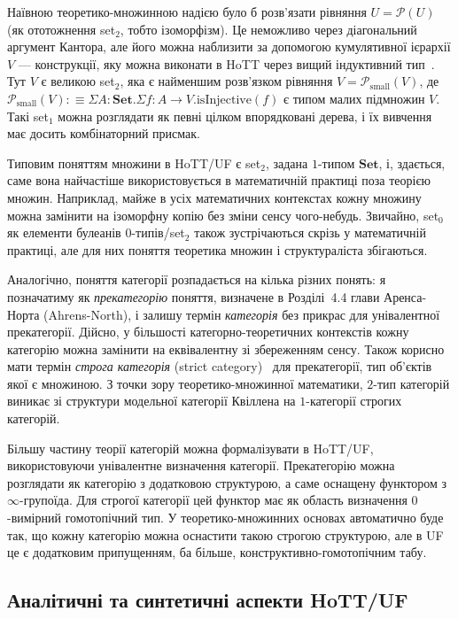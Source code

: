 \documentclass[12pt]{article}
\newcommand*{\Set}{\ensuremath{\mathbf{Set}}}
\begin{document}
Наївною теоретико-множинною надією було б розв'язати рівняння $U = \mathcal P(U)$ (як ототожнення set$_2$, тобто ізоморфізм). Це неможливо через діагональний аргумент Кантора, але його можна наблизити за допомогою кумулятивної ієрархії $V$ — конструкції, яку можна виконати в HoTT через вищий індуктивний тип~\cite[Розділ~10.5]{HoTTBook}. Тут $V$ є великою set$_2$, яка є найменшим розв'язком рівняння $V = \mathcal P_{\mathrm{small}}(V)$, де $\mathcal P_{\mathrm{small}}(V)
:\equiv \Sigma A : \Set. \Sigma f : A \to V. \mathrm{isInjective}(f)$
є типом малих підмножин $V$. Такі set$_1$ можна розглядати як певні цілком впорядковані дерева, і їх вивчення має досить комбінаторний присмак.

Типовим поняттям множини в HoTT/UF є set$_2$, задана $1$-типом $\Set$, і, здається, саме вона найчастіше використовується в математичній практиці поза теорією множин. Наприклад, майже в усіх математичних контекстах кожну множину можна замінити на ізоморфну копію без зміни сенсу чого-небудь. Звичайно, set$_0$ як елементи булеанів $0$-типів/set$_2$ також зустрічаються скрізь у математичній практиці, але для них поняття теоретика множин і структураліста збігаються.

Аналогічно, поняття категорії розпадається на кілька різних понять: я позначатиму як \emph{прекатегорію} поняття, визначене в Розділі~4.4 глави Аренса-Норта (Ahrens-North), і залишу термін \emph{категорія} без прикрас для унівалентної прекатегорії. Дійсно, у більшості категорно-теоретичних контекстів кожну категорію можна замінити на еквівалентну зі збереженням сенсу. Також корисно мати термін \emph{строга категорія} (strict category)~\cite[Розділ~9.6]{HoTTBook} для прекатегорії, тип об'єктів якої є множиною. З точки зору теоретико-множинної математики, $2$-тип категорій виникає зі структури модельної категорії Квіллена на $1$-категорії строгих категорій.

Більшу частину теорії категорій можна формалізувати в HoTT/UF, використовуючи унівалентне визначення категорії. Прекатегорію можна розглядати як категорію з додатковою структурою, а саме оснащену функтором з $\infty$-групоїда. Для строгої категорії цей функтор має як область визначення $0$-вимірний гомотопічний тип. У теоретико-множинних основах автоматично буде так, що кожну категорію можна оснастити такою строгою структурою, але в UF це є додатковим припущенням, ба більше, конструктивно-гомотопічним табу.

\subsection{Аналітичні та синтетичні аспекти HoTT/UF}
\end{document}
